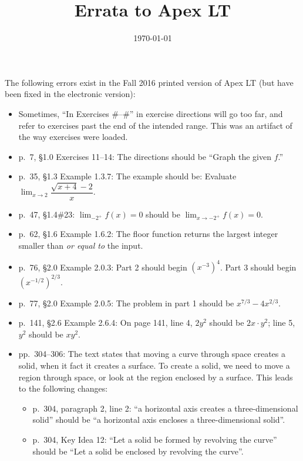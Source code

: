\documentclass{amsart}
\title{Errata to Apex LT}
\date{\today}
\newcommand{\ds}{\displaystyle}
\begin{document}
\maketitle

The following errors exist in the Fall 2016 printed version of Apex LT (but have been fixed in the electronic version):
\begin{itemize}
\item Sometimes, ``In Exercises \#--\#'' in exercise directions will go too far, and refer to exercises past the end of the intended range.  This was an artifact of the way exercises were loaded.
\item p.\ 7, \S1.0 Exercises 11--14: The directions should be ``Graph the given $f$.''
\item p.\ 35, \S1.3 Example 1.3.7: The example should be: Evaluate $\ds\lim_{x\to 2}\dfrac{\sqrt{x+4}-2}x$.
\item p.\ 47, \S1.4\#23: $\ds\lim_{-2^+}f(x)=0$ should be $\ds\lim_{x\to-2^+}f(x)=0$.
\item p.\ 62, \S1.6 Example 1.6.2: The floor function returns the largest integer smaller than \emph{or equal to} the input.
\item p.\ 76, \S2.0 Example 2.0.3: Part 2 should begin $(x^{-3})^4$.  Part 3 should begin $(x^{-1/2})^{2/3}$.
\item p.\ 77, \S2.0 Example 2.0.5: The problem in part 1 should be $x^{7/3}-4x^{2/3}$.
\item p.\ 141, \S2.6 Example 2.6.4: On page 141, line 4, $2y^2$ should be $2x\cdot y^2$; line 5, $y^2$ should be $xy^2$.
\item pp.\ 304--306: The text states that moving a curve through space creates a solid, when it fact it creates a surface.  To create a solid, we need to move a region through space, or look at the region enclosed by a surface.  This leads to the following changes:
\begin{itemize}
\item p.\ 304, paragraph 2, line 2: ``a horizontal axis creates a three-dimensional solid'' should be ``a horizontal axis encloses a three-dimensional solid''.
\item p.\ 304, Key Idea 12: ``Let a solid be formed by revolving the curve'' should be ``Let a solid be enclosed by revolving the curve''.

\end{itemize}
\end{itemize}
\end{document}
